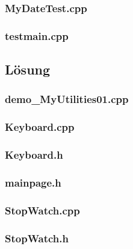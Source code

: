 \subsubsection{MyDateTest.cpp}

\subsubsection{testmain.cpp}



\setcounter{section}{6}
\setcounter{subsection}{1}

\subsection{Lösung}
\subsubsection{demo\_MyUtilities01.cpp}

\subsubsection{Keyboard.cpp}

\subsubsection{Keyboard.h}

\subsubsection{mainpage.h}

\subsubsection{StopWatch.cpp}

\subsubsection{StopWatch.h}


\setcounter{section}{7}
\setcounter{subsection}{1}


